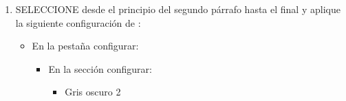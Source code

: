 \documentclass[letterpaper,10pt,spanish]{sphinxmanual}
\begin{document}
\begin{enumerate}
\begin{itemize}
\begin{itemize}
\item {} 
\sphinxAtStartPar
{} 16 pt

\item {} 
\sphinxAtStartPar
{} Negrita

\end{itemize}

\item {} 
\sphinxAtStartPar
En la pestaña  configurar:
\begin{itemize}
\item {} 
\sphinxAtStartPar
En la sección  configurar:
\begin{itemize}
\item {} 
\sphinxAtStartPar
{} Púrpura

\end{itemize}

\item {} 
\sphinxAtStartPar
En la sección  configurar:
\begin{itemize}
\item {} 
\sphinxAtStartPar
{} Sencillo

\item {} 
\sphinxAtStartPar
{} Púrpura

\end{itemize}

\item {} 
\sphinxAtStartPar
En la sección  configurar:
\begin{itemize}
\item {} 
\sphinxAtStartPar
Marcar la opción Sombra.

\end{itemize}

\end{itemize}

\item {} 
\sphinxAtStartPar
PULSE el botón .

\end{itemize}

\item {} 
\sphinxAtStartPar
SELECCIONE desde el principio del segundo párrafo hasta el final y aplique la siguiente configuración de :
\begin{itemize}
\item {} 
\sphinxAtStartPar
En la pestaña  configurar:
\begin{itemize}
\item {} 
\sphinxAtStartPar
En la sección  configurar:
\begin{itemize}
\item {} 
\sphinxAtStartPar
{} Gris oscuro 2


\end{itemize}
\end{itemize}
\end{itemize}
\end{enumerate}
\end{document}
